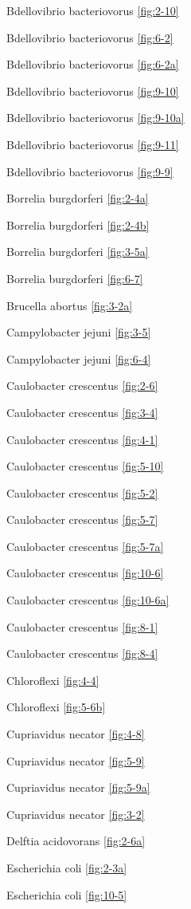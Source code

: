 \documentclass[]{tufte-book}
\begin{document}
Bdellovibrio bacteriovorus \ref{fig:2-10}

Bdellovibrio bacteriovorus \ref{fig:6-2}

Bdellovibrio bacteriovorus \ref{fig:6-2a}

Bdellovibrio bacteriovorus \ref{fig:9-10}

Bdellovibrio bacteriovorus \ref{fig:9-10a}

Bdellovibrio bacteriovorus \ref{fig:9-11}

Bdellovibrio bacteriovorus \ref{fig:9-9}

Borrelia burgdorferi \ref{fig:2-4a}

Borrelia burgdorferi \ref{fig:2-4b}

Borrelia burgdorferi \ref{fig:3-5a}

Borrelia burgdorferi \ref{fig:6-7}

Brucella abortus \ref{fig:3-2a}

Campylobacter jejuni \ref{fig:3-5}

Campylobacter jejuni \ref{fig:6-4}

Caulobacter crescentus \ref{fig:2-6}

Caulobacter crescentus \ref{fig:3-4}

Caulobacter crescentus \ref{fig:4-1}

Caulobacter crescentus \ref{fig:5-10}

Caulobacter crescentus \ref{fig:5-2}

Caulobacter crescentus \ref{fig:5-7}

Caulobacter crescentus \ref{fig:5-7a}

Caulobacter crescentus \ref{fig:10-6}

Caulobacter crescentus \ref{fig:10-6a}

Caulobacter crescentus \ref{fig:8-1}

Caulobacter crescentus \ref{fig:8-4}

Chloroflexi \ref{fig:4-4}

Chloroflexi \ref{fig:5-6b}

Cupriavidus necator \ref{fig:4-8}

Cupriavidus necator \ref{fig:5-9}

Cupriavidus necator \ref{fig:5-9a}

Cupriavidus necator \ref{fig:3-2}

Delftia acidovorans \ref{fig:2-6a}

Escherichia coli \ref{fig:2-3a}

Escherichia coli \ref{fig:10-5}
\end{document}
